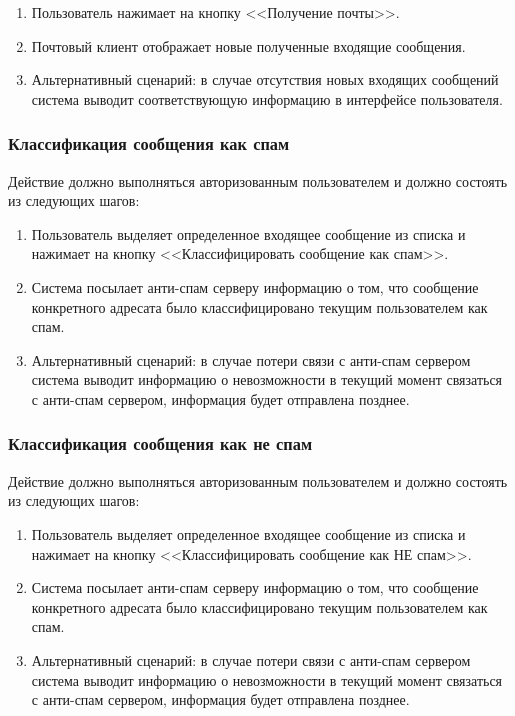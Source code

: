 \begin{enumerate}
  \item Пользователь нажимает на кнопку <<Получение почты>>.
  \item Почтовый клиент отображает новые полученные входящие сообщения.
  \item Альтернативный сценарий: в случае отсутствия новых входящих сообщений система выводит соответствующую информацию в интерфейсе пользователя.
\end{enumerate}

\subsubsection{Классификация сообщения как спам}
Действие должно выполняться авторизованным пользователем и должно состоять из следующих шагов:

\begin{enumerate}
  \item Пользователь выделяет определенное входящее сообщение из списка и нажимает на кнопку <<Классифицировать сообщение как спам>>.
  \item Система посылает анти-спам серверу информацию о том, что сообщение конкретного адресата было классифицировано текущим пользователем как спам.
  \item Альтернативный сценарий: в случае потери связи с анти-спам сервером система выводит информацию о невозможности в текущий момент связаться с анти-спам сервером, информация будет отправлена позднее.
\end{enumerate}

\subsubsection{Классификация сообщения как не спам}
Действие должно выполняться авторизованным пользователем и должно состоять из следующих шагов:

\begin{enumerate}
  \item Пользователь выделяет определенное входящее сообщение из списка и нажимает на кнопку <<Классифицировать сообщение как НЕ спам>>.
  \item Система посылает анти-спам серверу информацию о том, что сообщение конкретного адресата было классифицировано текущим пользователем как спам.
  \item Альтернативный сценарий: в случае потери связи с анти-спам сервером система выводит информацию о невозможности в текущий момент связаться с анти-спам сервером, информация будет отправлена позднее.
\end{enumerate}



